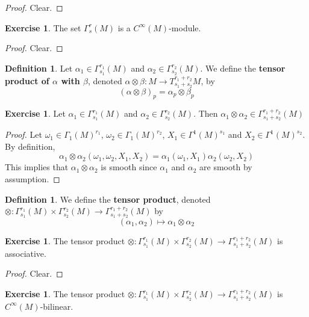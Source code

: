 \documentclass{book}
\theoremstyle{definition}
\newtheorem{defn}[definition]{Definition}
\newtheorem{ex}[definition]{Exercise}
\newcommand{\al}{\alpha}
\newcommand{\be}{\beta}
\newcommand{\om}{\omega}
\newcommand{\Gam}{\Gamma}
\DeclareMathOperator*{\0}{\mbf{0}}
\DeclareMathOperator*{\1}{\mbf{1}}
\begin{document}
	\begin{proof}
	Clear.
	\end{proof}
	
	\begin{ex}
	The set $\Gam^r_s(M)$ is a $C^{\infty}(M)$-module.
	\end{ex}
	
	\begin{proof}
	Clear.
	\end{proof}
	
	\begin{defn}
	Let $\al_1 \in \Gam^{r_1}_{s_1}(M)$ and $\al_2 \in \Gam^{r_2}_{s_2}(M)$. We define the \textbf{tensor product of $\al$ with $\be$}, denoted $\al \otimes \be : M \rightarrow T^{r_1 + r_2}_{s_1 + s_2}M$, by $$(\al \otimes \be)_p = \al_p \otimes \be_p$$
	\end{defn}
	
	\begin{ex}
	Let $\al_1 \in \Gam^{r_1}_{s_1}(M)$ and $\al_2 \in \Gam^{r_2}_{s_2}(M)$. Then $\al_1 \otimes \al_2 \in \Gam^{r_1 + r_2}_{s_1 + s_2}(M)$
	\end{ex}
	
	\begin{proof}
	Let $\om_1 \in \Gam_1(M)^{r_1}$, $\om_2 \in \Gam_1(M)^{r_2}$, $X_1 \in \Gam^1(M)^{s_1}$ and $X_2 \in \Gam^1(M)^{s_2}$. By definition,
	$$\al_1 \otimes \al_2 (\om_1, \om_2, X_1, X_2) = \al_1(\om_1, X_1) \al_2(\om_2, X_2)$$
	This implies that $\al_1 \otimes \al_2$ is smooth since $\al_1$ and $\al_2$ are smooth by assumption.
	\end{proof}
	
	\begin{defn}
	We define the \textbf{tensor product}, denoted $\otimes : \Gam^{r_1}_{s_1}(M) \times \Gam^{r_2}_{s_2}(M) \rightarrow \Gam^{r_1+r_2}_{s_1+s_2}(M)$ by $$(\al_1, \al_2) \mapsto \al_1 \otimes \al_2 $$
	\end{defn}	
	
	\begin{ex}
	The tensor product $\otimes : \Gam^{r_1}_{s_1}(M) \times \Gam^{r_2}_{s_2}(M) \rightarrow \Gam^{r_1+r_2}_{s_1+s_2}(M)$ is associative.
	\end{ex}
	
	\begin{proof}
	Clear.
	\end{proof}
	
	\begin{ex}
	The tensor product $\otimes : \Gam^{r_1}_{s_1}(M) \times \Gam^{r_2}_{s_2}(M) \rightarrow \Gam^{r_1+r_2}_{s_1+s_2}(M)$ is $C^{\infty}(M)$-bilinear.
	\end{ex}
	
\end{document}
